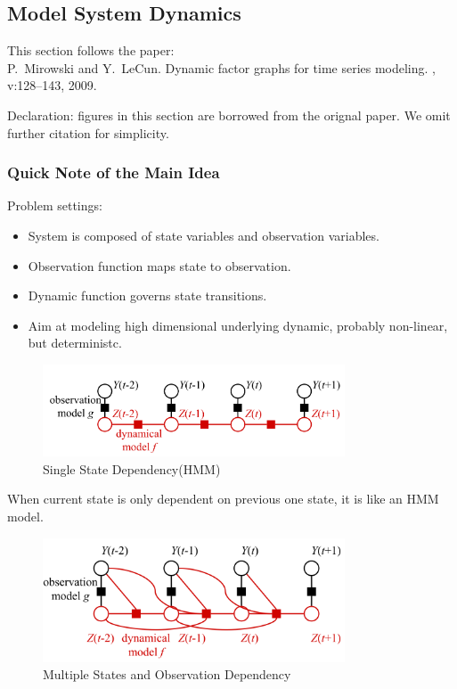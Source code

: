 \documentclass[11pt,a4paper]{article}
\begin{document}
\subsection{Model System Dynamics}
This section follows the paper:\\
P.~Mirowski and Y.~LeCun.
\newblock Dynamic factor graphs for time series modeling.
,
  v:128--143, 2009.
  
Declaration: figures in this section are borrowed from the orignal paper\cite{mirowski2009dynamic}. 
We omit further citation for simplicity.


\subsubsection{Quick Note of the Main Idea}

Problem settings:
\begin{itemize}
	\item System is composed of state variables and observation 
	variables. 
	\item Observation function maps state to observation. 
	\item Dynamic function governs state transitions. 
	\item Aim at modeling high dimensional underlying dynamic, 
	probably non-linear, but deterministc. 
\end{itemize}

\begin{figure}[htb]
\centering
	\includegraphics[width=0.8\textwidth]{fig/mirowski2009-HMM.png}
	\caption{Single State Dependency(HMM)}
\end{figure}	

When current state is only dependent on previous one state, it
is like an HMM model. 

\begin{figure}[htb]
\centering
	\includegraphics[width=0.8\textwidth]{fig/mirowski2009-framework.png}
	\caption{Multiple States and Observation Dependency}
\end{figure}
\end{document}
